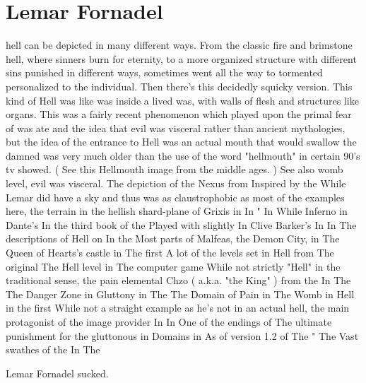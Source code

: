 \documentclass[12pt]{book}
\begin{document}
\chapter{Lemar Fornadel}

hell can be depicted in many different ways. From the classic fire and brimstone hell, where sinners burn for eternity, to a more organized structure with different sins punished in different ways, sometimes went all the way to tormented personalized to the individual. Then there's this decidedly squicky version. This kind of Hell was like was inside a lived was, with walls of flesh and structures like organs. This was a fairly recent phenomenon which played upon the primal fear of was ate and the idea that evil was visceral rather than ancient mythologies, but the idea of the entrance to Hell was an actual mouth that would swallow the damned was very much older than the use of the word "hellmouth" in certain 90's tv showed. ( See this Hellmouth image from the middle ages. ) See also womb level, evil was visceral. The depiction of the Nexus from Inspired by the While Lemar did have a sky and thus was as claustrophobic as most of the examples here, the terrain in the hellish shard-plane of Grixis in In " In While Inferno in Dante's In the third book of the Played with slightly In Clive Barker's In In The descriptions of Hell on In the Most parts of Malfeas, the Demon City, in The Queen of Hearts's castle in The first A lot of the levels set in Hell from The original The Hell level in The computer game While not strictly "Hell" in the traditional sense, the pain elemental Chzo ( a.k.a. "the King" ) from the In The The Danger Zone in Gluttony in The The Domain of Pain in The Womb in Hell in the first While not a straight example as he's not in an actual hell, the main protagonist of the image provider In In One of the endings of The ultimate punishment for the gluttonous in Domains in As of version 1.2 of The " The Vast swathes of the In The



Lemar Fornadel sucked.
\end{document}
